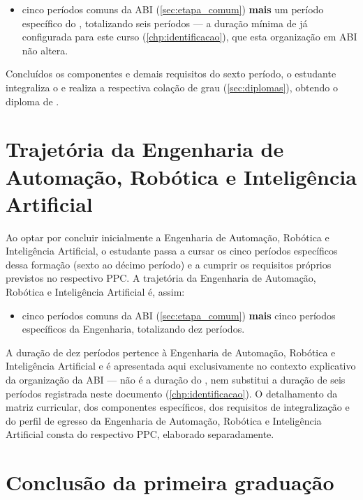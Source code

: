 \begin{itemize}
    \item cinco períodos comuns da ABI (\autoref{sec:etapa_comum}) \textbf{mais} um período específico do \ppccurso, totalizando seis períodos — a duração mínima de \ppctempominimo já configurada para este curso (\autoref{chp:identificacao}), que esta organização em ABI não altera.
\end{itemize}

Concluídos os componentes e demais requisitos do sexto período, o estudante integraliza o \ppccurso e realiza a respectiva colação de grau (\autoref{sec:diplomas}), obtendo o diploma de \ppcgrau.

\section{Trajetória da Engenharia de Automação, Robótica e Inteligência Artificial}
\label{sec:trajetoria_engenharia}

Ao optar por concluir inicialmente a Engenharia de Automação, Robótica e Inteligência Artificial, o estudante passa a cursar os cinco períodos específicos dessa formação (sexto ao décimo período) e a cumprir os requisitos próprios previstos no respectivo PPC. A trajetória da Engenharia de Automação, Robótica e Inteligência Artificial é, assim:

\begin{itemize}
    \item cinco períodos comuns da ABI (\autoref{sec:etapa_comum}) \textbf{mais} cinco períodos específicos da Engenharia, totalizando dez períodos.
\end{itemize}

A duração de dez períodos pertence à Engenharia de Automação, Robótica e Inteligência Artificial e é apresentada aqui exclusivamente no contexto explicativo da organização da ABI — não é a duração do \ppccurso, nem substitui a duração de seis períodos registrada neste documento (\autoref{chp:identificacao}). O detalhamento da matriz curricular, dos componentes específicos, dos requisitos de integralização e do perfil de egresso da Engenharia de Automação, Robótica e Inteligência Artificial consta do respectivo PPC, elaborado separadamente.

\section{Conclusão da primeira graduação}
\label{sec:conclusao_primeira}

